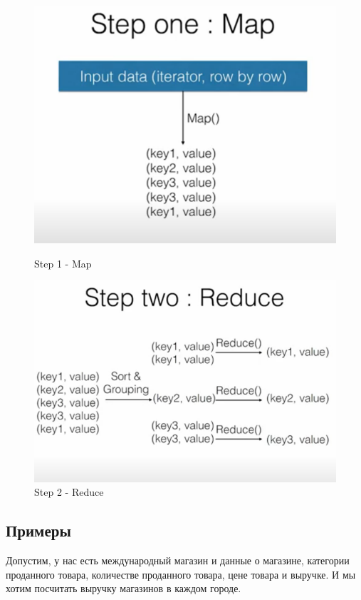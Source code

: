 \documentclass{article}
\begin{document}
\begin{figure}[h]
\centering
\includegraphics[width=1\textwidth, trim={0 1cm 0 0}, clip]{Map.png}
\caption{Step 1 - Map}

\includegraphics[width=1\textwidth, trim={0 2cm 0 0}, clip]{Reduce.png}
\caption{Step 2 - Reduce}
\end{figure}

\clearpage


\subsection{Примеры}

Допустим, у нас есть международный магазин и данные о магазине, категории проданного товара, количестве проданного товара, цене товара и выручке. И мы хотим посчитать выручку магазинов в каждом городе.
\end{document}
